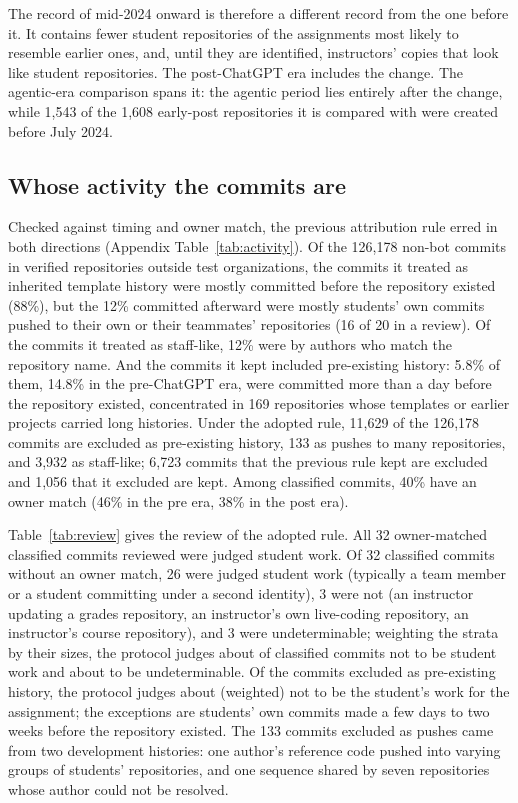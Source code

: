 \documentclass[acmsmall,screen,review,anonymous]{acmart}
\begin{document}
The record of mid-2024 onward is therefore a different record from the one before it. It contains fewer student repositories of the assignments most likely to resemble earlier ones, and, until they are identified, instructors' copies that look like student repositories. The post-ChatGPT era includes the change. The agentic-era comparison spans it: the agentic period lies entirely after the change, while 1,543 of the 1,608 early-post repositories it is compared with were created before July 2024.

\subsection{Whose activity the commits are}
\label{sec:whose}

Checked against timing and owner match, the previous attribution rule erred in both directions (Appendix Table~\ref{tab:activity}). Of the 126,178 non-bot commits in verified repositories outside test organizations, the commits it treated as inherited template history were mostly committed before the repository existed (88\%), but the 12\% committed afterward were mostly students' own commits pushed to their own or their teammates' repositories (16 of 20 in a review). Of the commits it treated as staff-like, 12\% were by authors who match the repository name. And the commits it kept included pre-existing history: 5.8\% of them, 14.8\% in the pre-ChatGPT era, were committed more than a day before the repository existed, concentrated in 169 repositories whose templates or earlier projects carried long histories. Under the adopted rule, 11,629 of the 126,178 commits are excluded as pre-existing history, 133 as pushes to many repositories, and 3,932 as staff-like; 6,723 commits that the previous rule kept are excluded and 1,056 that it excluded are kept. Among classified commits, 40\% have an owner match (46\% in the pre era, 38\% in the post era).



Table~\ref{tab:review} gives the review of the adopted rule. All 32 owner-matched classified commits reviewed were judged student work. Of 32 classified commits without an owner match, 26 were judged student work (typically a team member or a student committing under a second identity), 3 were not (an instructor updating a grades repository, an instructor's own live-coding repository, an instructor's course repository), and 3 were undeterminable; weighting the strata by their sizes, the protocol judges about  of classified commits not to be student work and about  to be undeterminable. Of the commits excluded as pre-existing history, the protocol judges about  (weighted) not to be the student's work for the assignment; the exceptions are students' own commits made a few days to two weeks before the repository existed. The 133 commits excluded as pushes came from two development histories: one author's reference code pushed into varying groups of students' repositories, and one sequence shared by seven repositories whose author could not be resolved.
\end{document}

